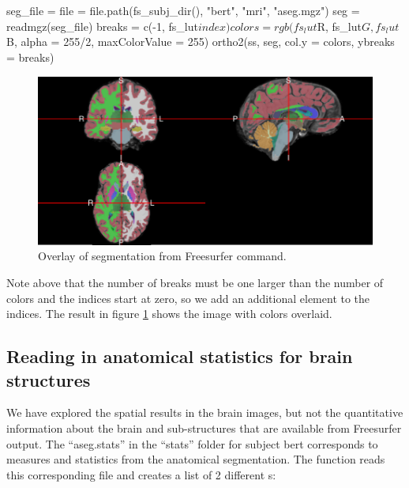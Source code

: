 \begin{Schunk}
\begin{Sinput}
seg_file = file = file.path(fs_subj_dir(), "bert", "mri", "aseg.mgz")
seg = readmgz(seg_file)
breaks = c(-1, fs_lut$index)
colors = rgb(fs_lut$R, fs_lut$G, fs_lut$B, alpha = 255/2, maxColorValue = 255)
ortho2(ss, seg, col.y = colors, ybreaks = breaks)
\end{Sinput}
\end{Schunk}

\begin{Schunk}
\begin{figure}
\includegraphics{muschelli_files/figure-latex/seg_file-1} \caption[Overlay of segmentation from Freesurfer  command]{Overlay of segmentation from Freesurfer  command.  }\label{fig:seg_file}
\end{figure}
\end{Schunk}

Note above that the number of breaks must be one larger than the number
of colors and the indices start at zero, so we add an additional element
to the indices. The result in figure \ref{fig:seg_file} shows the image
with colors overlaid.

\subsection{Reading in anatomical statistics for brain
structures}\label{reading-in-anatomical-statistics-for-brain-structures}

We have explored the spatial results in the brain images, but not the
quantitative information about the brain and sub-structures that are
available from Freesurfer output. The ``aseg.stats'' in the ``stats''
folder for subject bert corresponds to measures and statistics from the
anatomical segmentation. The  function reads
this corresponding file and creates a list of 2 different
s:

